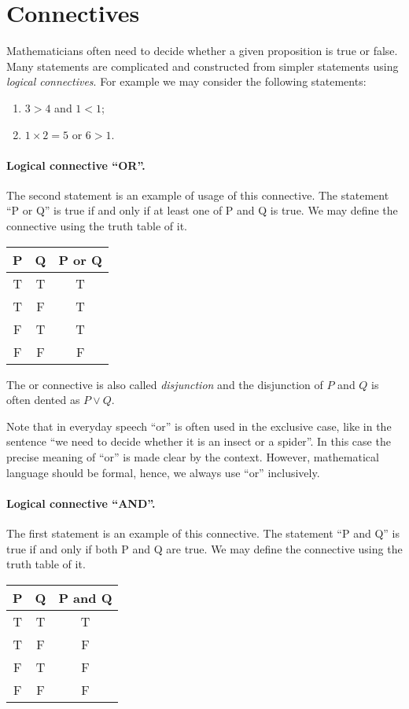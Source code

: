 \section{Connectives}

Mathematicians often need to decide whether a given proposition is true or
false. Many statements are complicated and constructed from simpler statements
using \emph{logical connectives}. For example we may consider the following
statements:
\begin{enumerate}
  \item $3 > 4$ and $1 < 1$;
  \item $1 \times 2 = 5$ or $6 > 1$.
\end{enumerate}

\paragraph{Logical connective ``OR''.}
The second statement is an example of usage of this connective. The statement
``P or Q'' is true if and only if at least one of P and Q is true. We may
define the connective using the truth table of it.
\begin{center}
  \begin{tabular}{c | c | c}
    P & Q & P or Q \\
    \hline
    T & T & T \\
    T & F & T \\
    F & T & T \\
    F & F & F
  \end{tabular}
\end{center}

The or connective is also called \emph{disjunction} and the disjunction of $P$
and $Q$ is often dented as $P \lor Q$.


\begin{warning}
  Note that in everyday speech ``or'' is often used in the exclusive case, like
  in the sentence ``we need to decide whether it is an insect or a spider''.
  In this case the precise meaning of ``or'' is made clear by the context.
  However, mathematical language should be formal, hence, we always use ``or''
  inclusively.
\end{warning}

\paragraph{Logical connective ``AND''.}
The first statement is an example of this connective. The statement ``P and Q''
is true if and only if both P and Q are true. We may define the
connective using the truth table of it.
\begin{center}
  \begin{tabular}{c | c | c}
    P & Q & P and Q \\
    \hline
    T & T & T \\
    T & F & F \\
    F & T & F \\
    F & F & F
  \end{tabular}
\end{center}

